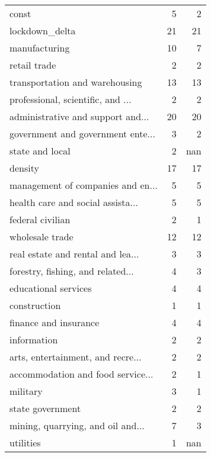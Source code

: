 \begin{tabular}{lrr}
\hline
 const                             &  5 &   2 \\
 lockdown\_delta                    & 21 &  21 \\
 manufacturing                     & 10 &   7 \\
 retail trade                      &  2 &   2 \\
 transportation and warehousing    & 13 &  13 \\
 professional, scientific, and ... &  2 &   2 \\
 administrative and support and... & 20 &  20 \\
 government and government ente... &  3 &   2 \\
 state and local                   &  2 & nan \\
 density                           & 17 &  17 \\
 management of companies and en... &  5 &   5 \\
 health care and social assista... &  5 &   5 \\
 federal civilian                  &  2 &   1 \\
 wholesale trade                   & 12 &  12 \\
 real estate and rental and lea... &  3 &   3 \\
 forestry, fishing, and related... &  4 &   3 \\
 educational services              &  4 &   4 \\
 construction                      &  1 &   1 \\
 finance and insurance             &  4 &   4 \\
 information                       &  2 &   2 \\
 arts, entertainment, and recre... &  2 &   2 \\
 accommodation and food service... &  2 &   1 \\
 military                          &  3 &   1 \\
 state government                  &  2 &   2 \\
 mining, quarrying, and oil and... &  7 &   3 \\
 utilities                         &  1 & nan \\
\hline
\end{tabular}